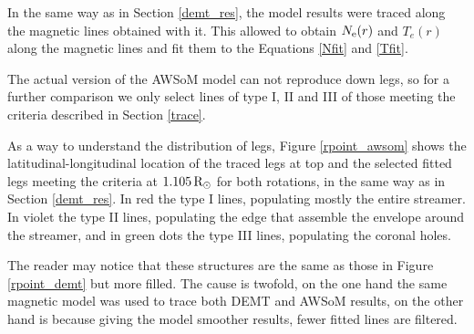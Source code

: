 \documentclass[namedreferences]{solarphysics}
\newcommand{\mrsun}{{\rm R_\odot}}
\newcommand{\Ne}{N_{\rm e}}
\def\temp#1{\textcolor{gray}{#1}}
\begin{document}
\begin{article}

In the same way as in Section \ref{demt_res}, the model results were traced along the magnetic lines obtained with it. This allowed to obtain $\Ne(r)$ and $T_e(r)$ along the magnetic lines and fit them to the Equations \ref{Nfit} and \ref{Tfit}.

The actual version of the AWSoM model can not reproduce down legs, so for a further comparison we only select lines of type I, II and III of those meeting the criteria described in Section \ref{trace}.

As a way to understand the distribution of legs, Figure \ref{rpoint_awsom} shows the latitudinal-longitudinal location of the traced legs at top and the selected fitted legs meeting the criteria at $1.105\,\mrsun$ for both rotations, in the same way as in Section \ref{demt_res}. In red the type I lines, populating mostly the entire streamer. In violet the type II lines, populating the edge that assemble the envelope around the streamer, and in green dots the type III lines, populating the coronal holes.

The reader may notice that these structures are the same as those in Figure \ref{rpoint_demt} but more filled. The cause is twofold, on the one hand the same magnetic model was used to trace both DEMT and AWSoM results, on the other hand is because giving the model smoother results, fewer fitted lines are filtered.



\end{article}
\end{document}
